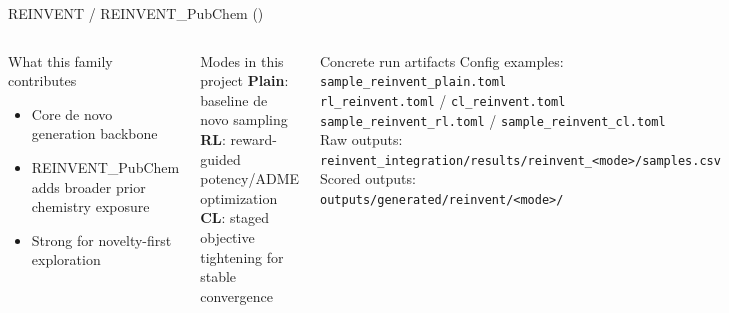 \documentclass[aspectratio=169,10pt]{beamer}
\begin{document}
\begin{frame}{REINVENT / REINVENT\_PubChem (\checkmark \checkmark \checkmark)}
  \small
  \begin{columns}[T]
      \begin{block}{What this family contributes}
        \begin{itemize}
          \item Core de novo generation backbone
          \item REINVENT\_PubChem adds broader prior chemistry exposure
          \item Strong for novelty-first exploration
        \end{itemize}
      \end{block}
      \begin{block}{Modes in this project}
        \textbf{Plain}: baseline de novo sampling\\
        \textbf{RL}: reward-guided potency/ADME optimization\\
        \textbf{CL}: staged objective tightening for stable convergence
      \end{block}
      \begin{block}{Concrete run artifacts}
        Config examples:\\
        {\scriptsize\texttt{sample\_reinvent\_plain.toml}}\\
        {\scriptsize\texttt{rl\_reinvent.toml}} / {\scriptsize\texttt{cl\_reinvent.toml}}\\
        {\scriptsize\texttt{sample\_reinvent\_rl.toml}} / {\scriptsize\texttt{sample\_reinvent\_cl.toml}}\\[2pt]
        Raw outputs:\\
        {\scriptsize\texttt{reinvent\_integration/results/reinvent\_<mode>/samples.csv}}\\
        Scored outputs:\\
        {\scriptsize\texttt{outputs/generated/reinvent/<mode>/}}
      \end{block}
  \end{columns}
\end{frame}
\end{document}
